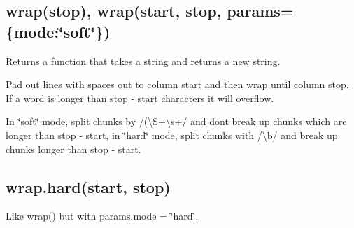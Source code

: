 \subsection*{wrap(stop), wrap(start, stop, params=\{mode\+:\char`\"{}soft\char`\"{}\}) }

Returns a function that takes a string and returns a new string.

Pad out lines with spaces out to column {\ttfamily start} and then wrap until column {\ttfamily stop}. If a word is longer than {\ttfamily stop -\/ start} characters it will overflow.

In \char`\"{}soft\char`\"{} mode, split chunks by {\ttfamily /(\textbackslash{}S+\textbackslash{}s+/} and don\textquotesingle{}t break up chunks which are longer than {\ttfamily stop -\/ start}, in \char`\"{}hard\char`\"{} mode, split chunks with {\ttfamily /\textbackslash{}b/} and break up chunks longer than {\ttfamily stop -\/ start}.

\subsection*{wrap.\+hard(start, stop) }

Like {\ttfamily wrap()} but with {\ttfamily params.\+mode = \char`\"{}hard\char`\"{}}. 